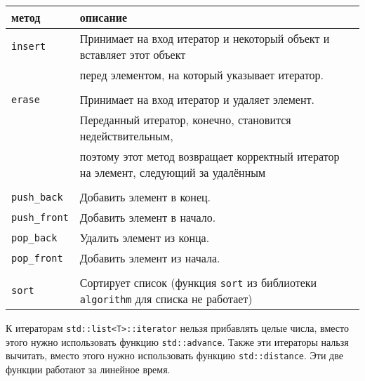 \documentclass{article}
\begin{document}
\begin{center}
\begin{tabular}{ l | l }
 метод & описание \\ \hline
 \texttt{insert} & Принимает на вход итератор и некоторый объект и вставляет этот объект\\
                 & перед элементом, на который указывает итератор.  \\ \\ \hline
 \texttt{erase}  & Принимает на вход итератор и удаляет элемент.\\
                 & Переданный итератор, конечно, становится недействительным,  \\ 
                 & поэтому этот метод возвращает корректный итератор на элемент, следующий за удалённым \\ \\ \hline
 \texttt{push\_back}  & Добавить элемент в конец.\\
 \texttt{push\_front}  & Добавить элемент в начало.\\
 \texttt{pop\_back}   & Удалить элемент из конца.\\
 \texttt{pop\_front}  & Добавить элемент из начала.\\ \\ \hline
 \texttt{sort}       & Сортирует список (функция \texttt{sort} из библиотеки \texttt{algorithm} для списка не работает) 
\end{tabular}
\end{center}

К итераторам \texttt{std::list<T>::iterator} нельзя прибавлять целые числа, вместо этого нужно использовать функцию \texttt{std::advance}. Также эти итераторы нальзя вычитать, вместо этого нужно использовать функцию \texttt{std::distance}. Эти две функции работают за линейное время.
\end{document}
